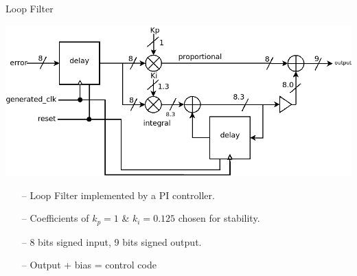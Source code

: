 \documentclass{beamer}
\begin{document}
\begin{frame}{Loop Filter}
    \vspace{-0.67 cm}
 	\begin{center}
        \includegraphics[scale=0.325]{../loop_filter.png}
 	\end{center}	
	\begin{itemize}
		\item[--]
            Loop Filter implemented by a PI controller.
        \item[--]
            Coefficients of $k_p=1$ \& $k_i=0.125$ chosen for stability. \cite{pid_coeffs}
        \item[--]
        	8 bits signed input, 9 bits signed output.
        \item[--]
        	Output + bias = control code
    \end{itemize}
\end{frame}
\end{document}
